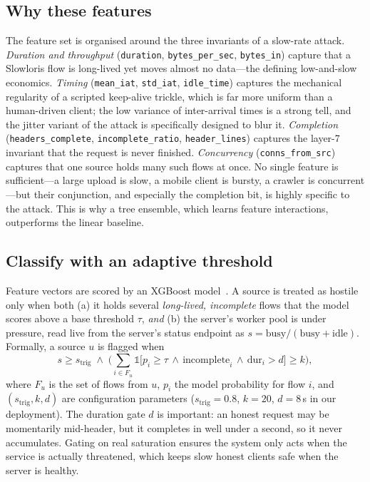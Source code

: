 \documentclass[conference]{IEEEtran}
\begin{document}
\subsection{Why these features}
The feature set is organised around the three invariants of a slow-rate attack.
\emph{Duration and throughput} (\texttt{duration}, \texttt{bytes\_per\_sec},
\texttt{bytes\_in}) capture that a Slowloris flow is long-lived yet moves almost no
data---the defining low-and-slow economics. \emph{Timing} (\texttt{mean\_iat},
\texttt{std\_iat}, \texttt{idle\_time}) captures the mechanical regularity of a
scripted keep-alive trickle, which is far more uniform than a human-driven client;
the low variance of inter-arrival times is a strong tell, and the jitter variant of
the attack is specifically designed to blur it. \emph{Completion}
(\texttt{headers\_complete}, \texttt{incomplete\_ratio},
\texttt{header\_lines}) captures the layer-7 invariant that the request is never
finished. \emph{Concurrency} (\texttt{conns\_from\_src}) captures that one source
holds many such flows at once. No single feature is sufficient---a large upload is
slow, a mobile client is bursty, a crawler is concurrent---but their conjunction,
and especially the completion bit, is highly specific to the attack. This is why a
tree ensemble, which learns feature interactions, outperforms the linear baseline.

\subsection{Classify with an adaptive threshold}
Feature vectors are scored by an XGBoost model~\cite{chen2016xgboost}. A source
is treated as hostile only when both (a) it holds several \emph{long-lived,
incomplete} flows that the model scores above a base threshold $\tau$,
\emph{and} (b) the server's worker pool is under pressure, read live from the
server's status endpoint as $s=\text{busy}/(\text{busy}+\text{idle})$. Formally,
a source $u$ is flagged when
\[
s \ge s_{\text{trig}} \;\wedge\;
\Big( \textstyle\sum_{i \in F_u} \mathbb{1}\big[p_i \ge \tau \,\wedge\,
\text{incomplete}_i \,\wedge\, \text{dur}_i > d\big] \ge k \Big),
\]
where $F_u$ is the set of flows from $u$, $p_i$ the model probability for flow
$i$, and $(s_{\text{trig}}, k, d)$ are configuration parameters
($s_{\text{trig}}{=}0.8$, $k{=}20$, $d{=}8$\,s in our deployment). The duration
gate $d$ is important: an honest request may be momentarily mid-header, but it
completes in well under a second, so it never accumulates. Gating on real
saturation ensures the system only acts when the service is actually threatened,
which keeps slow honest clients safe when the server is healthy.
\end{document}
